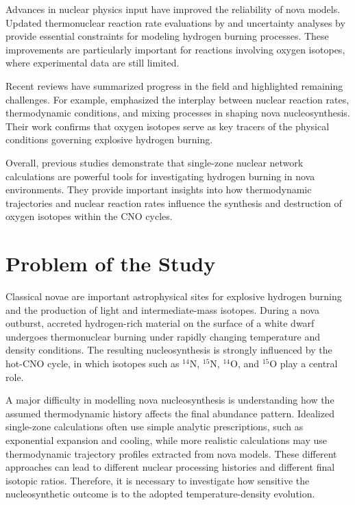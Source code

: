 Advances in nuclear physics input have improved the reliability of nova models. Updated thermonuclear reaction rate evaluations by \cite{Iliadis2010} and uncertainty analyses by \cite{Champagne2014} provide essential constraints for modeling hydrogen burning processes. These improvements are particularly important for reactions involving oxygen isotopes, where experimental data are still limited.

Recent reviews have summarized progress in the field and highlighted remaining challenges. For example, \cite{Jose2020} emphasized the interplay between nuclear reaction rates, thermodynamic conditions, and mixing processes in shaping nova nucleosynthesis. Their work confirms that oxygen isotopes serve as key tracers of the physical conditions governing explosive hydrogen burning.

Overall, previous studies demonstrate that single-zone nuclear network calculations are powerful tools for investigating hydrogen burning in nova environments. They provide important insights into how thermodynamic trajectories and nuclear reaction rates influence the synthesis and destruction of oxygen isotopes within the CNO cycles.


\section{Problem of the Study}

Classical novae are important astrophysical sites for explosive hydrogen burning and the production of light and intermediate-mass isotopes. During a nova outburst, accreted hydrogen-rich material on the surface of a white dwarf undergoes thermonuclear burning under rapidly changing temperature and density conditions. The resulting nucleosynthesis is strongly influenced by the hot-CNO cycle, in which isotopes such as $^{14}\mathrm{N}$, $^{15}\mathrm{N}$, $^{14}\mathrm{O}$, and $^{15}\mathrm{O}$ play a central role.

A major difficulty in modelling nova nucleosynthesis is understanding how the assumed thermodynamic history affects the final abundance pattern. Idealized single-zone calculations often use simple analytic prescriptions, such as exponential expansion and cooling, while more realistic calculations may use thermodynamic trajectory profiles extracted from nova models. These different approaches can lead to different nuclear processing histories and different final isotopic ratios. Therefore, it is necessary to investigate how sensitive the nucleosynthetic outcome is to the adopted temperature-density evolution.


